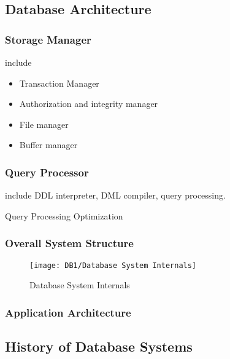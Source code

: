 \subsection{Database Architecture}

\subsubsection{Storage Manager}
include
\begin{itemize}
    \item Transaction Manager
    \item Authorization and integrity manager
    \item File manager
    \item Buffer manager
\end{itemize}

\subsubsection{Query Processor}
include DDL interpreter, DML compiler, query processing. 

Query Processing Optimization

\subsubsection{Overall System Structure}

\begin{figure}[H]
    \centering
    \texttt{[image: DB1/Database System Internals]}
    \caption{Database System Internals}
\end{figure}


\subsubsection{Application Architecture}

\subsection{History of Database Systems}

